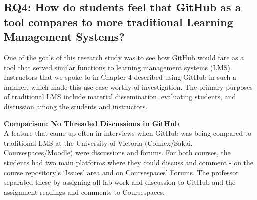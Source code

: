 



\subsection{RQ4: How do students feel that GitHub as a tool compares to more traditional Learning Management Systems?}
One of the goals of this research study was to see how GitHub would fare as a tool that served similar functions to learning management systems (LMS). Instructors that we spoke to in Chapter 4 described using GitHub in such a manner, which made this use case worthy of investigation. The primary purposes of traditional LMS include material dissemination, evaluating students, and discussion among the students and instructors.

\textbf{Comparison: No Threaded Discussions in GitHub} \\
A feature that came up often in interviews when GitHub was being compared to traditional LMS at the University of Victoria (Connex/Sakai, Coursespaces/Moodle) were discussions and forums. For both courses, the students had two main platforms where they could discuss and comment - on the course repository's `Issues' area and on Coursespaces' Forums. The professor separated these by assigning all lab work and discussion to GitHub and the assignment readings and comments to Coursespaces.


